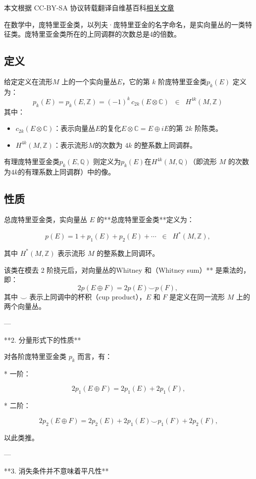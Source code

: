 
本文根据 CC-BY-SA 协议转载翻译自维基百科\href{https://en.wikipedia.org/wiki/Pontryagin_class}{相关文章}

在数学中，庞特里亚金类，以列夫·庞特里亚金的名字命名，是实向量丛的一类特征类。庞特里亚金类所在的上同调群的次数总是4的倍数。
\subsection{定义}
给定定义在流形$M$ 上的一个实向量丛$E$，它的第 $k$ 阶庞特里亚金类$p_k(E)$ 定义为：
$$
p_k(E) = p_k(E, \mathbb{Z}) = (-1)^k \, c_{2k}(E \otimes \mathbb{C}) 
\;\; \in \;\; H^{4k}(M, \mathbb{Z})~
$$
其中：
\begin{itemize}
\item $c_{2k}(E \otimes \mathbb{C})$：表示向量丛$E$的复化$E \otimes \mathbb{C} = E \oplus iE$的第 $2k$ 阶陈类。
\item $H^{4k}(M, \mathbb{Z})$：表示流形$M$的次数为 $4k$ 的整系数上同调群。
\end{itemize}
有理庞特里亚金类$p_k(E, \mathbb{Q})$ 则定义为$p_k(E)$在$H^{4k}(M, \mathbb{Q})$（即流形 $M$ 的次数为$4k$的有理系数上同调群）中的像。
\subsection{性质}
总庞特里亚金类，实向量丛 $E$ 的**总庞特里亚金类**定义为：

$$
p(E) = 1 + p_1(E) + p_2(E) + \cdots \;\;\in\;\; H^*(M, \mathbb{Z}),~
$$

其中 $H^*(M, \mathbb{Z})$ 表示流形 $M$ 的整系数上同调环。

该类在模去 2 阶挠元后，对向量丛的Whitney 和（Whitney sum）** 是乘法的，即：
$$
2p(E \oplus F) = 2p(E) \smile p(F),~
$$
其中 $\smile$ 表示上同调中的杯积（cup product），$E$ 和 $F$ 是定义在同一流形 $M$ 上的两个向量丛。

---

**2. 分量形式下的性质**

对各阶庞特里亚金类 $p_k$ 而言，有：

* 一阶：

  $$
  2p_1(E \oplus F) = 2p_1(E) + 2p_1(F),
  $$

* 二阶：

  $$
  2p_2(E \oplus F) = 2p_2(E) + 2p_1(E) \smile p_1(F) + 2p_2(F),
  $$

以此类推。

---

**3. 消失条件并不意味着平凡性**

